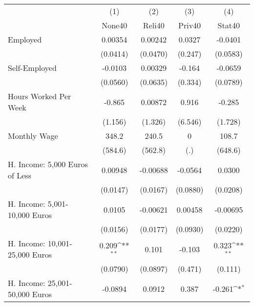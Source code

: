 {
\def\sym#1{\ifmmode^{#1}\else\(^{#1}\)\fi}
\begin{tabular}{l*{4}{c}}
\hline\hline
            &\multicolumn{1}{c}{(1)}&\multicolumn{1}{c}{(2)}&\multicolumn{1}{c}{(3)}&\multicolumn{1}{c}{(4)}\\
            &\multicolumn{1}{c}{None40}&\multicolumn{1}{c}{Reli40}&\multicolumn{1}{c}{Priv40}&\multicolumn{1}{c}{Stat40}\\
\hline
Employed    &     0.00354         &     0.00242         &      0.0327         &     -0.0401         \\
            &    (0.0414)         &    (0.0470)         &     (0.247)         &    (0.0583)         \\
[1em]
Self-Employed&     -0.0103         &     0.00329         &      -0.164         &     -0.0659         \\
            &    (0.0560)         &    (0.0635)         &     (0.334)         &    (0.0789)         \\
[1em]
Hours Worked Per Week&      -0.865         &     0.00872         &       0.916         &      -0.285         \\
            &     (1.156)         &     (1.326)         &     (6.546)         &     (1.728)         \\
[1em]
Monthly Wage&       348.2         &       240.5         &           0         &       108.7         \\
            &     (584.6)         &     (562.8)         &         (.)         &     (648.6)         \\
[1em]
H. Income: 5,000 Euros of Less&     0.00948         &    -0.00688         &     -0.0564         &      0.0300         \\
            &    (0.0147)         &    (0.0167)         &    (0.0880)         &    (0.0208)         \\
[1em]
H. Income: 5,001-10,000 Euros&      0.0105         &    -0.00621         &     0.00458         &    -0.00695         \\
            &    (0.0156)         &    (0.0177)         &    (0.0930)         &    (0.0220)         \\
[1em]
H. Income: 10,001-25,000 Euros&       0.209\sym{**} &       0.101         &      -0.103         &       0.323\sym{**} \\
            &    (0.0790)         &    (0.0897)         &     (0.471)         &     (0.111)         \\
[1em]
H. Income: 25,001-50,000 Euros&     -0.0894         &      0.0912         &       0.387         &      -0.261\sym{*}  \\

\end{tabular}}
